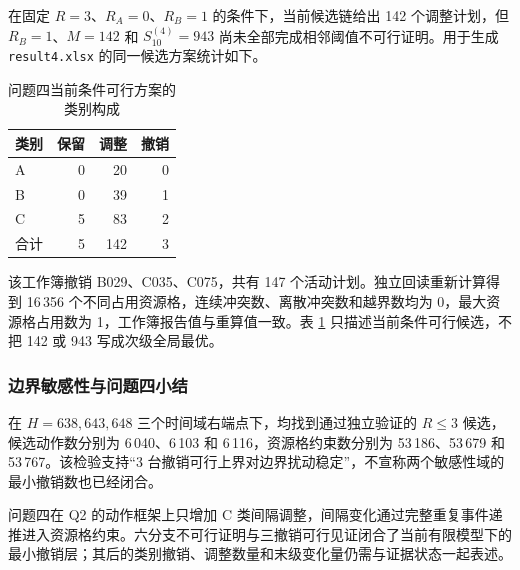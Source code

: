 在固定 \(R=3\)、\(R_A=0\)、\(R_B=1\) 的条件下，当前候选链给出 142 个调整计划，但 \(R_B=1\)、\(M=142\) 和 \(S_{10}^{(4)}=943\) 尚未全部完成相邻阈值不可行证明。用于生成 \texttt{result4.xlsx} 的同一候选方案统计如下。

\begin{table}[H]
\centering
\caption{问题四当前条件可行方案的类别构成}
\label{tab:q4-candidate}
\begin{tabular}{lrrr}
\toprule
类别 & 保留 & 调整 & 撤销 \\
\midrule
A & 0 & 20 & 0 \\
B & 0 & 39 & 1 \\
C & 5 & 83 & 2 \\
\midrule
合计 & 5 & 142 & 3 \\
\bottomrule
\end{tabular}
\end{table}

该工作簿撤销 B029、C035、C075，共有 147 个活动计划。独立回读重新计算得到 16\,356 个不同占用资源格，连续冲突数、离散冲突数和越界数均为 0，最大资源格占用数为 1，工作簿报告值与重算值一致。表 \ref{tab:q4-candidate} 只描述当前条件可行候选，不把 142 或 943 写成次级全局最优。

\subsubsection{边界敏感性与问题四小结}

在 \(H=638,643,648\) 三个时间域右端点下，均找到通过独立验证的 \(R\le3\) 候选，候选动作数分别为 6\,040、6\,103 和 6\,116，资源格约束数分别为 53\,186、53\,679 和 53\,767。该检验支持“3 台撤销可行上界对边界扰动稳定”，不宣称两个敏感性域的最小撤销数也已经闭合。

问题四在 Q2 的动作框架上只增加 C 类间隔调整，间隔变化通过完整重复事件递推进入资源格约束。六分支不可行证明与三撤销可行见证闭合了当前有限模型下的最小撤销层；其后的类别撤销、调整数量和末级变化量仍需与证据状态一起表述。
